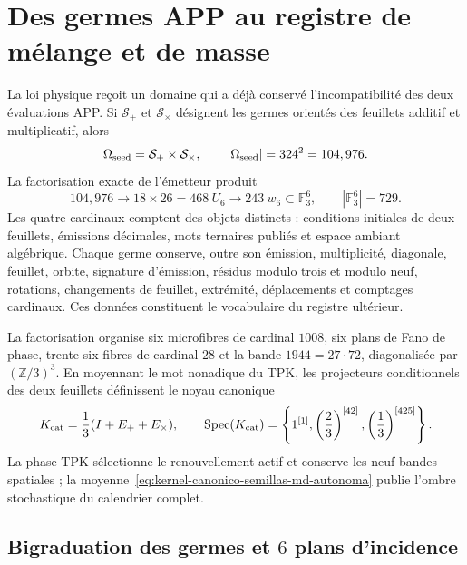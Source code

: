 \section{Des germes APP au registre de mélange et de masse}
\label{sec:semillas-registro-mezcla-autonoma}

La loi physique reçoit un domaine qui a déjà conservé l'incompatibilité des
deux évaluations APP. Si
\(\mathcal S_+\) et \(\mathcal S_\times\) désignent les germes orientés des
feuillets additif et multiplicatif, alors
\begin{equation}
 \Omega_{\rm seed}=\mathcal S_+\times\mathcal S_\times,
 \qquad
 |\Omega_{\rm seed}|=324^2=104,976.
 \label{eq:dominio-semillas-md-autonoma}
\end{equation}
La factorisation exacte de l'émetteur produit
\begin{equation}
 104,976
 \longrightarrow18\times26=468\ U_6
 \longrightarrow243\ w_6\subset\mathbb F_3^6,
 \qquad |\mathbb F_3^6|=729.
 \label{eq:embudo-semillas-md-autonoma}
\end{equation}
Les quatre cardinaux comptent des objets distincts : conditions initiales de
deux feuillets, émissions décimales, mots ternaires publiés et espace ambiant
algébrique. Chaque germe conserve, outre son émission, multiplicité,
diagonale, feuillet, orbite, signature d'émission, résidus modulo trois et modulo
neuf, rotations, changements de feuillet, extrémité, déplacements et comptages
cardinaux. Ces données constituent le vocabulaire du registre ultérieur.

La factorisation organise six microfibres de cardinal \(1008\), six plans
de Fano de phase, trente-six fibres de cardinal \(28\) et la bande
\(1944=27\cdot72\), diagonalisée par \((\mathbb Z/3)^3\). En moyennant le
mot nonadique du TPK, les projecteurs conditionnels des deux feuillets
définissent le noyau canonique
\begin{equation}
 K_{\rm cat}=\frac13(I+E_++E_\times),
 \qquad
 \operatorname{Spec}(K_{\rm cat})
 =\left\{1^{[1]},
 \left(\frac23\right)^{[42]},
 \left(\frac13\right)^{[425]}\right\}.
 \label{eq:kernel-canonico-semillas-md-autonoma}
\end{equation}
La phase TPK sélectionne le renouvellement actif et conserve les neuf bandes
spatiales ; la moyenne~\eqref{eq:kernel-canonico-semillas-md-autonoma}
publie l'ombre stochastique du calendrier complet.

\subsection{Bigraduation des germes et \(6\) plans d'incidence}

